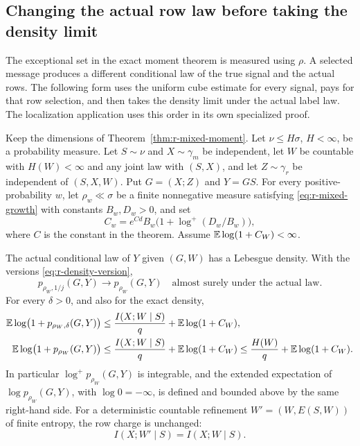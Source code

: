 \subsection{Changing the actual row law before taking the density limit}
\label{subsec:r-actual-row-limit}

The exceptional set in the exact moment theorem is measured using
\(\rho\).  A selected message produces a different conditional law
of the true signal and the actual rows.  The following form uses the
uniform cube estimate for every signal, pays for that row selection,
and then takes the density limit under the actual label law.  The
localization application uses this order in its own specialized proof.

\begin{proposition}
\label{prop:r-actual-row-limit}
Keep the dimensions of Theorem~\ref{thm:r-mixed-moment}.  Let
\(\nu\le H\sigma\), \(H<\infty\), be a probability measure.
Let \(S\sim\nu\) and \(X\sim\gamma_m\) be independent, let \(W\)
be countable with \(H(W)<\infty\) and any joint law with
\((S,X)\), and let \(Z\sim\gamma_r\) be independent of
\((S,X,W)\).  Put \(G=(X;Z)\) and \(Y=GS\).
For every positive-probability \(w\), let \(\rho_w\ll\sigma\)
be a finite nonnegative measure satisfying
\eqref{eq:r-mixed-growth} with constants \(B_w,D_w>0\), and set
\[
 C_w=e^{Cd}B_w\bigl(1+\log^+(D_w/B_w)\bigr),
\]
where \(C\) is the constant in the theorem.  Assume
\(\mathbb E\log(1+C_W)<\infty\).

The actual conditional law of \(Y\) given \((G,W)\) has a
Lebesgue density.  With the versions
\eqref{eq:r-density-version},
\[
 p_{\rho_W,1/j}(G,Y)\longrightarrow p_{\rho_W}(G,Y)
 \quad\text{almost surely under the actual law}.
\]
For every \(\delta>0\), and also for the exact density,
\begin{align}
 \mathbb E\log\bigl(1+p_{\rho_W,\delta}(G,Y)\bigr)
 &\le \frac{I(X;W\mid S)}q+\mathbb E\log(1+C_W),
 \label{eq:r-actual-smoothed}\\
 \mathbb E\log\bigl(1+p_{\rho_W}(G,Y)\bigr)
 &\le \frac{I(X;W\mid S)}q+\mathbb E\log(1+C_W)
 \le \frac{H(W)}q+\mathbb E\log(1+C_W).
 \label{eq:r-actual-exact}
\end{align}
In particular \(\log^+p_{\rho_W}(G,Y)\) is integrable, and the
extended expectation of \(\log p_{\rho_W}(G,Y)\), with
\(\log0=-\infty\), is defined and bounded above by the same
right-hand side.  For a deterministic countable refinement
\(W'=(W,E(S,W))\) of finite entropy, the row charge is unchanged:
\[
 I(X;W'\mid S)=I(X;W\mid S).
\]
\end{proposition}

